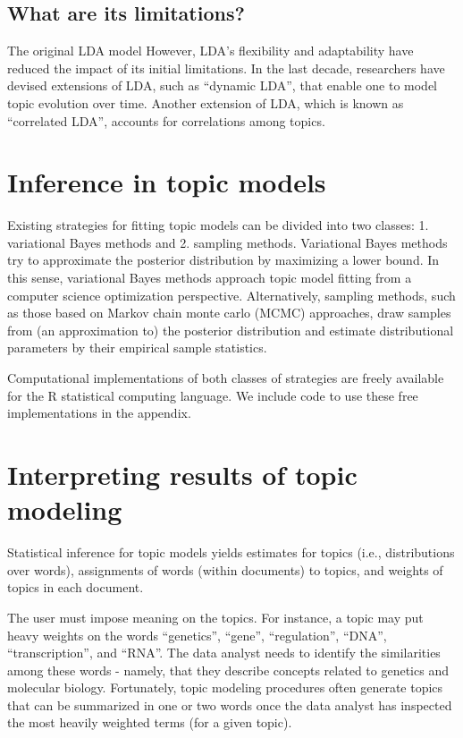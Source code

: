 \documentclass[12pt,]{article}
\begin{document}
\subsection{What are its limitations?}\label{what-are-its-limitations}

The original LDA model However, LDA's flexibility and adaptability have
reduced the impact of its initial limitations. In the last decade,
researchers have devised extensions of LDA, such as ``dynamic LDA'',
that enable one to model topic evolution over time. Another extension of
LDA, which is known as ``correlated LDA'', accounts for correlations
among topics.

\section{Inference in topic models}\label{inference-in-topic-models}

Existing strategies for fitting topic models can be divided into two
classes: 1. variational Bayes methods and 2. sampling methods.
Variational Bayes methods try to approximate the posterior distribution
by maximizing a lower bound. In this sense, variational Bayes methods
approach topic model fitting from a computer science optimization
perspective. Alternatively, sampling methods, such as those based on
Markov chain monte carlo (MCMC) approaches, draw samples from (an
approximation to) the posterior distribution and estimate distributional
parameters by their empirical sample statistics.

Computational implementations of both classes of strategies are freely
available for the R statistical computing language. We include code to
use these free implementations in the appendix.

\section{Interpreting results of topic
modeling}\label{interpreting-results-of-topic-modeling}

Statistical inference for topic models yields estimates for topics
(i.e., distributions over words), assignments of words (within
documents) to topics, and weights of topics in each document.

The user must impose meaning on the topics. For instance, a topic may
put heavy weights on the words ``genetics'', ``gene'', ``regulation'',
``DNA'', ``transcription'', and ``RNA''. The data analyst needs to
identify the similarities among these words - namely, that they describe
concepts related to genetics and molecular biology. Fortunately, topic
modeling procedures often generate topics that can be summarized in one
or two words once the data analyst has inspected the most heavily
weighted terms (for a given topic).
\end{document}
